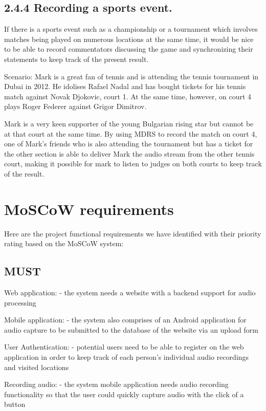 \documentclass{l3proj}
\begin{document}
\subsection{2.4.4 Recording a sports event.} If there is a sports event such as a championship or a tournament which involves matches being played on numerous locations at the same time, it would be nice to be able to record commentators discussing the game and synchronizing their statements to keep track of the present result.

Scenario: Mark is a great fan of tennis and is attending the tennis tournament in Dubai in 2012. He idolises Rafael Nadal and has bought tickets for his tennis match against Novak Djokovic, court 1. At the same time, however, on court 4 plays Roger Federer against Grigor Dimitrov. 

Mark is a very keen supporter of the young Bulgarian rising star but cannot be at that court at the same time. By using MDRS to record the match on court 4, one of Mark’s friends who is also attending the tournament but has a ticket for the other section is able to deliver Mark the audio stream from the other tennis court, making it possible for mark to listen to judges on both courts to keep track of the result.




\section{MoSCoW requirements}

Here are the project functional requirements we have identified with their priority rating based on the MoSCoW system:

	\subsection{MUST}
		Web application:
			- the system needs a website with a backend support for audio processing

		Mobile application:
			- the system also comprises of an Android application for audio capture to be submitted to the database of the website via an upload form

		User Authentication:
			- potential users need to be able to register on the web application in order to keep track of each person's individual audio recordings and visited locations

		Recording audio:
			- the system mobile application needs audio recording functionality so that the user could quickly capture audio with the click of a button
\end{document}
